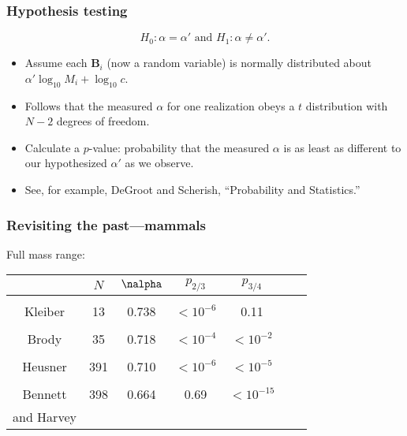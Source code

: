 \begin{frame}
  \frametitle{Hypothesis testing}

  \begin{block}{}

  $$ H_0: \alpha = \alpha' \mbox{\ and\ } H_1: \alpha \ne \alpha'.$$

  \begin{itemize}
  \item<2->
    Assume each $\mathbf{B}_i$ (now a random variable)
    is normally distributed
    about $\alpha' \log_{10} M_i + \log_{10} c$.
  \item<3-> 
    Follows that the measured $\alpha$ for
    one realization obeys
    a $t$ distribution with $N-2$ degrees of freedom.
  \item<4-> 
    Calculate a $p$-value: probability that the measured
    $\alpha$ is as least as different to our hypothesized
    $\alpha'$ as we observe.
  \item<5-> 
    See, for example, DeGroot and Scherish, ``Probability and Statistics.''\cite{degroot1975a}
  \end{itemize}
  \end{block}

\end{frame}

\begin{frame}
  \frametitle{Revisiting the past---mammals}

  \begin{block}{Full mass range:}
    \settablerowcolours
    \begin{tabular}{ccccccc}
             & $N$ & $\nalpha$ & $p_{2/3}$ & $p_{3/4}$ \\ \hline
              & & & & & & \\
      Kleiber             &  13 & 0.738 & $<10^{-6}$ & 0.11 \\
              & & & & & & \\
      Brody               &  35 & 0.718 & $<10^{-4}$ & $<10^{-2}$ \\
              & & & & & & \\
      Heusner             & 391 & 0.710 & $<10^{-6}$ & $<10^{-5}$ \\
              & & & & & & \\
      Bennett   & 398 & 0.664 & 0.69 &     $<10^{-15}$ \\
      and Harvey & & & & & & \\
    \end{tabular}
  \end{block}

\end{frame}

